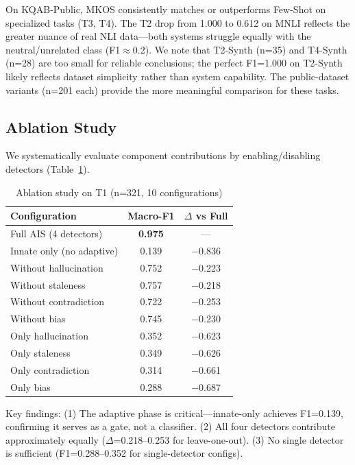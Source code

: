 \documentclass[11pt]{article}
\begin{document}
On KQAB-Public, MKOS consistently matches or outperforms Few-Shot on specialized tasks (T3, T4). The T2 drop from 1.000 to 0.612 on MNLI reflects the greater nuance of real NLI data---both systems struggle equally with the neutral/unrelated class (F1$\approx$0.2). We note that T2-Synth (n=35) and T4-Synth (n=28) are too small for reliable conclusions; the perfect F1=1.000 on T2-Synth likely reflects dataset simplicity rather than system capability. The public-dataset variants (n=201 each) provide the more meaningful comparison for these tasks.

\subsection{Ablation Study}

We systematically evaluate component contributions by enabling/disabling detectors (Table~\ref{tab:ablation}).

\begin{table}[h]
\centering
\caption{Ablation study on T1 (n=321, 10 configurations)}
\label{tab:ablation}
\begin{tabular}{lcc}
\toprule
\textbf{Configuration} & \textbf{Macro-F1} & \textbf{$\Delta$ vs Full} \\
\midrule
Full AIS (4 detectors) & \textbf{0.975} & --- \\
Innate only (no adaptive) & 0.139 & $-$0.836 \\
\midrule
Without hallucination & 0.752 & $-$0.223 \\
Without staleness & 0.757 & $-$0.218 \\
Without contradiction & 0.722 & $-$0.253 \\
Without bias & 0.745 & $-$0.230 \\
\midrule
Only hallucination & 0.352 & $-$0.623 \\
Only staleness & 0.349 & $-$0.626 \\
Only contradiction & 0.314 & $-$0.661 \\
Only bias & 0.288 & $-$0.687 \\
\bottomrule
\end{tabular}
\end{table}

Key findings: (1) The adaptive phase is critical---innate-only achieves F1=0.139, confirming it serves as a gate, not a classifier. (2) All four detectors contribute approximately equally ($\Delta$=0.218--0.253 for leave-one-out). (3) No single detector is sufficient (F1=0.288--0.352 for single-detector configs).
\end{document}
